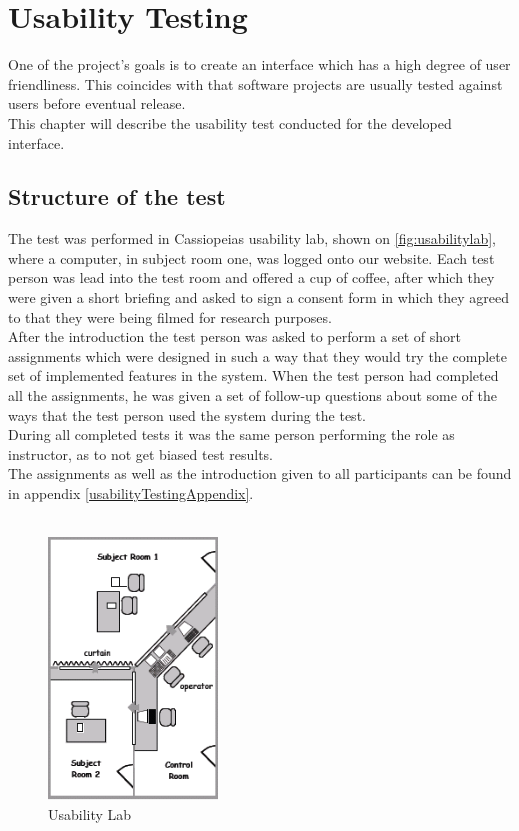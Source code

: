 \chapter{Usability Testing}
\label{chap:usabilityTesting}
One of the project's goals is to create an interface which has a high degree of user friendliness. This coincides with that software projects  are usually tested against users before eventual release.\\
This chapter will describe the usability test conducted for the developed interface.

\section{Structure of the test}
The test was performed in Cassiopeias usability lab, shown on \autoref{fig:usabilitylab},  where a computer, in subject room one, was logged onto our website.
Each test person was lead into the test room and offered a cup of coffee, after which they were given a short briefing and asked to sign a consent form in which they agreed to that they were being filmed for research purposes.\\
After the introduction the test person was asked to perform a set of short assignments which were designed in such a way that they would try the complete set of implemented features in the system. 
When the test person had completed all the assignments,  he was given a set of follow-up questions about some of the ways that the test person used the system during the test.\\
During all completed tests it was the same person performing the role as instructor, as to not get biased test results.\\
The assignments as well as the introduction given to all participants can be found in appendix \vref{usabilityTestingAppendix}.\\
\\

\begin{figure}[!h]
	\centering
		\includegraphics[width=0.40\textwidth]{images/usabilitylab.png}
	\caption{Usability Lab}
	\label{fig:usabilitylab}
\end{figure}

